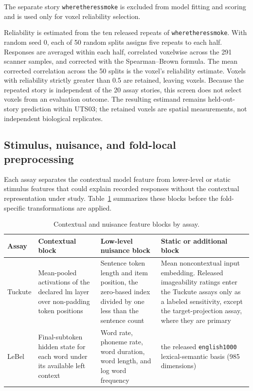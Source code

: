 The separate story \texttt{wheretheressmoke} is excluded from model fitting and scoring and is used only for voxel reliability selection. 

Reliability is estimated from the ten released repeats of \texttt{wheretheressmoke}.
With random seed 0, each of 50 random splits assigns five repeats to each half.
Responses are averaged within each half, correlated voxelwise across the 291 scanner samples, and corrected with the Spearman--Brown formula.
The mean corrected correlation across the 50 splits is the voxel's reliability estimate.
Voxels with reliability strictly greater than 0.5 are retained, leaving  voxels.
Because the repeated story is independent of the 20 assay stories, this screen does not select voxels from an evaluation outcome.
The resulting estimand remains held-out-story prediction within UTS03; the retained voxels are spatial measurements, not independent biological replicates. 

\subsection{Stimulus, nuisance, and fold-local preprocessing}

Each assay separates the contextual model feature from lower-level or static stimulus features that could explain recorded responses without the contextual representation under study.
Table~\ref{tab:appendix-feature-blocks} summarizes these blocks before the fold-specific transformations are applied.

\begin{table}[tbp]
  \centering
  \small
  \caption{Contextual and nuisance feature blocks by assay.}
  \label{tab:appendix-feature-blocks}
  \begin{tabularx}{\textwidth}{@{}>{\raggedright\arraybackslash}p{}>{\raggedright\arraybackslash}X>{\raggedright\arraybackslash}X>{\raggedright\arraybackslash}X@{}}
    \toprule
    Assay & Contextual block & Low-level nuisance block & Static or additional block \\
    \midrule
    Tuckute & Mean-pooled activations of the declared \ac{lm} layer over non-padding token positions & Sentence token length and item position, the zero-based index divided by one less than the sentence count & Mean noncontextual input embedding. Released imageability ratings enter the Tuckute assays only as a labeled sensitivity, except the target-projection assay, where they are primary \\
    \midrule
    LeBel & Final-subtoken hidden state for each word under its available left context & Word rate, phoneme rate, word duration, word length, and log word frequency & the released \texttt{english1000} lexical-semantic basis (985 dimensions) \\
    \bottomrule
  \end{tabularx}
\end{table}

